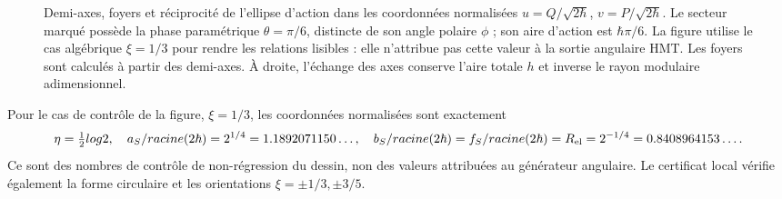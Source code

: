 \begin{figure}[htbp]
\endgroup


 \caption{Demi-axes, foyers et réciprocité de l'ellipse d'action dans les
 coordonnées normalisées \(u=Q/\sqrt{2\hbar}\),
 \(v=P/\sqrt{2\hbar}\). Le secteur marqué possède la phase paramétrique
 \(\theta=\pi/6\), distincte de son angle polaire \(\phi\) ; son aire
 d'action est \(\hbar\pi/6\). La figure utilise le cas algébrique
 \(\xi=1/3\) pour rendre les relations lisibles : elle n'attribue pas cette valeur
 à la sortie angulaire HMT. Les foyers sont calculés à partir des demi-axes.
 À droite, l'échange des axes conserve l'aire totale \(h\)
 et inverse le rayon modulaire adimensionnel.}
 \label{ii:fig:ii-elipse-calculada}
\end{figure}

Pour le cas de contrôle de la figure, \(\xi=1/3\), les coordonnées
normalisées sont exactement
\[
 \eta=\tfrac12\log2,\quad
 \frac{a_S}{\sqrt{2\hbar}}=2^{1/4}=1.1892071150\ldots,\quad
 \frac{b_S}{\sqrt{2\hbar}}=
 \frac{f_S}{\sqrt{2\hbar}}=R_{\rm el}=2^{-1/4}=0.8408964153\ldots.
\]
Ce sont des nombres de contrôle de non-régression du dessin, non des valeurs attribuées au générateur
angulaire. Le certificat local vérifie également la forme circulaire et les
orientations \(\xi=\pm1/3,\pm3/5\).

